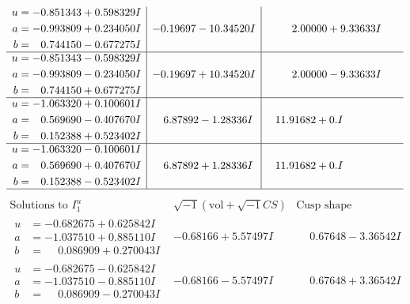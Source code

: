 \documentclass[1p]{elsarticle_modified}
\theoremstyle{definition}
\newcommand{\I}{\sqrt{-1}}
\begin{document}
$$\begin{array}{c|c|c}
\begin{aligned}
u &= -0.851343 + 0.598329 I \\
a &= -0.993809 + 0.234050 I \\
b &= \phantom{-}0.744150 - 0.677275 I\end{aligned}
 & -0.19697 - 10.34520 I & \phantom{-}2.00000 + 9.33633 I \\ \hline\begin{aligned}
u &= -0.851343 - 0.598329 I \\
a &= -0.993809 - 0.234050 I \\
b &= \phantom{-}0.744150 + 0.677275 I\end{aligned}
 & -0.19697 + 10.34520 I & \phantom{-}2.00000 - 9.33633 I \\ \hline\begin{aligned}
u &= -1.063320 + 0.100601 I \\
a &= \phantom{-}0.569690 - 0.407670 I \\
b &= \phantom{-}0.152388 + 0.523402 I\end{aligned}
 & \phantom{-}6.87892 - 1.28336 I & \phantom{-}11.91682 + 0. I\phantom{ +0.000000I} \\ \hline\begin{aligned}
u &= -1.063320 - 0.100601 I \\
a &= \phantom{-}0.569690 + 0.407670 I \\
b &= \phantom{-}0.152388 - 0.523402 I\end{aligned}
 & \phantom{-}6.87892 + 1.28336 I & \phantom{-}11.91682 + 0. I\phantom{ +0.000000I}\\
 \hline 
 \end{array}$$\newpage$$\begin{array}{c|c|c}  
\text{Solutions to }I^u_{1}& \I (\text{vol} + \sqrt{-1}CS) & \text{Cusp shape}\\
 \hline 
\begin{aligned}
u &= -0.682675 + 0.625842 I \\
a &= -1.037510 + 0.885110 I \\
b &= \phantom{-}0.086909 + 0.270043 I\end{aligned}
 & -0.68166 + 5.57497 I & \phantom{-}0.67648 - 3.36542 I \\ \hline\begin{aligned}
u &= -0.682675 - 0.625842 I \\
a &= -1.037510 - 0.885110 I \\
b &= \phantom{-}0.086909 - 0.270043 I\end{aligned}
 & -0.68166 - 5.57497 I & \phantom{-}0.67648 + 3.36542 I \\ \hline\begin{aligned}

\end{aligned}
\end{array}$$
\end{document}
